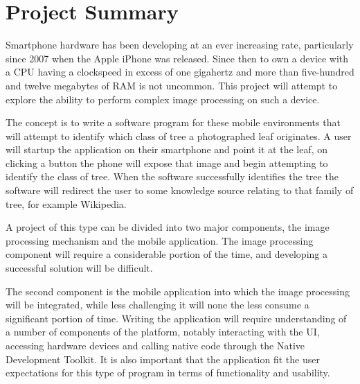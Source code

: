 \chapter*{Project Summary}

Smartphone hardware has been developing at an ever increasing rate, particularly since 2007 when the Apple iPhone\textsuperscript{\texttrademark} was released. Since then to own a device with a CPU having a clockspeed in excess of one gigahertz and more than five-hundred and twelve megabytes of RAM is not uncommon. This project will attempt to explore the ability to perform complex image processing on such a device. 

The concept is to write a software program for these mobile environments that will attempt to identify which class of tree a photographed leaf originates. A user will startup the application on their smartphone and point it at the leaf, on clicking a button the phone will expose that image and begin attempting to identify the class of tree. When the software successfully identifies the tree the software will redirect the user to some knowledge source relating to that family of tree, for example Wikipedia.

A project of this type can be divided into two major components, the image processing mechanism and the mobile application. The image processing component will require a considerable portion of the time, and developing a successful solution will be difficult.

The second component is the mobile application into which the image processing will be integrated, while less challenging it will none the less consume a significant portion of time. Writing the application will require understanding of a number of components of the platform, notably interacting with the UI, accessing hardware devices and calling native code through the Native Development Toolkit. It is also important that the application fit the user expectations for this type of program in terms of functionality and usability.
